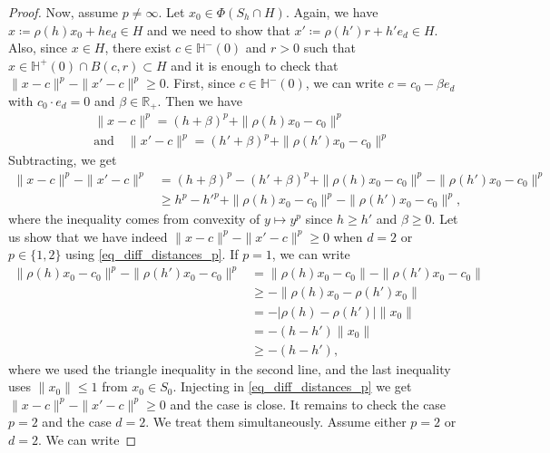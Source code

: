 \documentclass[a4paper, 11pt]{article}
\theoremstyle{plain}
\theoremstyle{definition}
\newcommand{\R}{\mathbb{R}}
\numberwithin{equation}{section}
\begin{document}
\begin{proof}
    Now, assume $p\neq\infty$. Let $x_0\in\Phi(S_h\cap H)$. Again, we have $x\coloneqq\rho(h) x_0+he_d\in H$ and we need to show that $x'\coloneqq\rho(h')r+h'e_d\in H$. Also, since $x\in H$, there exist $c\in\mathbb H^-(0)$ and $r>0$ such that $x\in \mathbb H^+(0)\cap B(c, r)\subset H$ and it is enough to check that $\|x-c\|^p-\|x'-c\|^p\geq 0$. First, since $c\in\mathbb H^-(0)$, we can write $c=c_0-\beta e_d$ with $c_0\cdot e_d=0$ and $\beta\in\R_+$. Then we have
    \begin{equation*}
        \begin{split}
            &\|x-c\|^p=(h+\beta)^p+\|\rho(h)x_0-c_0\|^p\\
           & \text{and}\quad\|x'-c\|^p=(h'+\beta)^p+\|\rho(h')x_0-c_0\|^p
        \end{split}
    \end{equation*}
    Subtracting, we get
    \begin{equation}
        \label{eq_diff_distances_p}
        \begin{split}
            \|x-c\|^p-\|x'-c\|^p&=(h+\beta)^p-(h'+\beta)^p+\|\rho(h)x_0-c_0\|^p-\|\rho(h')x_0-c_0\|^p\\
            &\geq h^p-{h'}^p+\|\rho(h)x_0-c_0\|^p-\|\rho(h')x_0-c_0\|^p,
        \end{split}
    \end{equation}
    where the inequality comes from convexity of $y\mapsto y^p$ since $h\geq h'$ and $\beta \geq0$. Let us show that we have indeed $\|x-c\|^p-\|x'-c\|^p\geq 0$ when $d=2$ or $p\in\{1, 2\}$ using \eqref{eq_diff_distances_p}. If $p=1$, we can write
    \begin{equation*}
        \begin{split}
            \|\rho(h)x_0-c_0\|^p-\|\rho(h')x_0-c_0\|^p&=\|\rho(h)x_0-c_0\|-\|\rho(h')x_0-c_0\|\\
            &\geq-\|\rho(h)x_0-\rho(h')x_0\|\\
            &=-|\rho(h)-\rho(h')|\|x_0\|\\
            &=-(h-h')\|x_0\|\\
            &\geq -(h-h'),
        \end{split}
    \end{equation*}
    where we used the triangle inequality in the second line, and the last inequality uses $\|x_0\|\leq 1$ from $x_0\in S_0$. Injecting in \eqref{eq_diff_distances_p} we get $\|x-c\|^p-\|x'-c\|^p\geq0$ and the case is close. It remains to check the case $p=2$ and the case $d=2$. We treat them simultaneously. Assume either $p=2$ or $d=2$. We can write

\end{proof}
\end{document}
